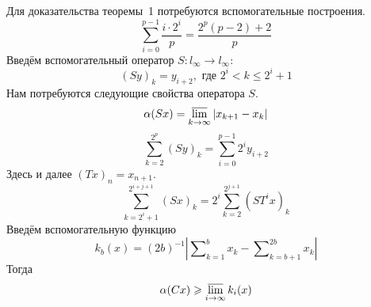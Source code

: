 \documentclass[a5paper,12pt,openbib]{report}
\begin{document}
Для доказательства теоремы~1 потребуются вспомогательные построения.
\begin{equation}\label{summa_drobey}
	\sum_{i=0}^{p-1} \frac{i \cdot 2^i}{p} = \frac{2^p(p-2) + 2}{p}
\end{equation}
Введём вспомогательный оператор $S:l_\infty \to l_\infty$:
\begin{equation*}\label{operator_S}
	(Sy)_k = y_{i+2}, \mbox{ где } 2^i < k \leqslant 2^i+1
\end{equation*}
Нам потребуются следующие свойства оператора $S$.
\begin{equation}\label{alpha_S}
	\alpha(Sx) = \varlimsup_{k\to\infty} |x_{k+1} - x_{k}|
\end{equation}
\begin{equation}\label{summa_S_less}
	\sum_{k=2}^{2^p} (Sy)_k =
	\sum_{i=0}^{p-1} 2^i y_{i+2}
\end{equation}
Здесь и далее $(Tx)_n = x_{n+1}$.
\begin{equation}\label{summa_S}
	\sum_{k=2^i+1}^{2^{i+j+1}} (Sx)_k =
	2^i\sum_{k=2}^{2^{j+1}} (ST^ix)_k
\end{equation}
Введём вспомогательную функцию
\begin{equation*}\label{def_k_b}
	k_b(x) = (2b)^{-1} \left|
		\sum\nolimits_{k=1}^{b}x_k - \sum\nolimits_{k=b+1}^{2b}x_k
	\right|
\end{equation*}
Тогда
\begin{equation}\label{alpha_greater_k_b}
	\alpha (Cx) \geqslant \varlimsup_{i\to \infty} k_i(x)
\end{equation}
\end{document}
